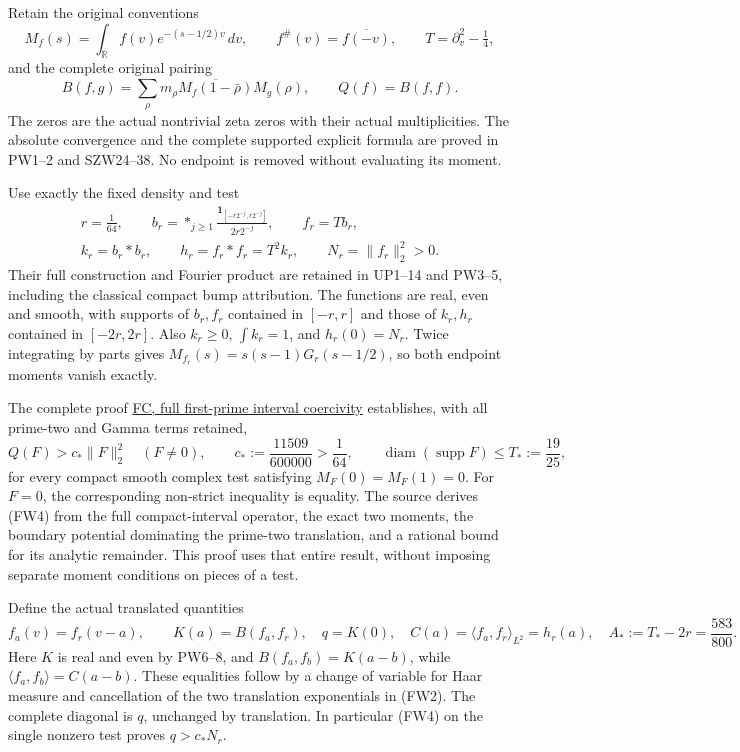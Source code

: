 \documentclass[
  10pt,
  a4paper,
]{article}
\begin{document}
Retain the original conventions \[
M_f(s)=\int_{\mathbb R}f(v)e^{-(s-1/2)v}\,dv,\qquad
f^\#(v)=\overline{f(-v)},\qquad
T=\partial_v^2-\tfrac14,
\tag{FW1}
\] and the complete original pairing \[
B(f,g)=\sum_\rho m_\rho\overline{M_f(1-\bar\rho)}M_g(\rho),
\qquad Q(f)=B(f,f).
\tag{FW2}
\] The zeros are the actual nontrivial zeta zeros with their actual
multiplicities. The absolute convergence and the complete supported
explicit formula are proved in PW1--2 and SZW24--38. No endpoint is
removed without evaluating its moment.

Use exactly the fixed density and test \[
\begin{gathered}
r=\tfrac1{64},\qquad
b_r=\mathop{*}_{j\ge1}\frac{\mathbf1_{[-r2^{-j},r2^{-j}]}}{2r2^{-j}},\qquad
f_r=Tb_r,\\
k_r=b_r*b_r,\qquad h_r=f_r*f_r=T^2k_r,\qquad
N_r=\|f_r\|_2^2>0.
\end{gathered}\tag{FW3}
\] Their full construction and Fourier product are retained in UP1--14
and PW3--5, including the classical compact bump attribution. The
functions are real, even and smooth, with supports of \(b_r,f_r\)
contained in \([-r,r]\) and those of \(k_r,h_r\) contained in
\([-2r,2r]\). Also \(k_r\ge0\), \(\int k_r=1\), and \(h_r(0)=N_r\).
Twice integrating by parts gives \(M_{f_r}(s)=s(s-1)G_r(s-1/2)\), so
both endpoint moments vanish exactly.

The complete proof \href{FIRST_PRIME_FULL_WEIL_COERCIVITY.md}{FC, full
first-prime interval coercivity} establishes, with all prime-two and
Gamma terms retained, \[
Q(F)>c_*\|F\|_2^2\quad(F\ne0),\qquad
c_*:=\frac{11509}{600000}>\frac1{64},\qquad
\operatorname{diam}(\operatorname{supp}F)\le T_*:=\frac{19}{25},
\tag{FW4}
\] for every compact smooth complex test satisfying \(M_F(0)=M_F(1)=0\).
For \(F=0\), the corresponding non-strict inequality is equality. The
source derives (FW4) from the full compact-interval operator, the exact
two moments, the boundary potential dominating the prime-two
translation, and a rational bound for its analytic remainder. This proof
uses that entire result, without imposing separate moment conditions on
pieces of a test.

Define the actual translated quantities \[
f_a(v)=f_r(v-a),\qquad
K(a)=B(f_a,f_r),\quad q=K(0),\quad
C(a)=\langle f_a,f_r\rangle_{L^2}=h_r(a),\quad
A_*:=T_*-2r=\frac{583}{800}.
\tag{FW5}
\] Here \(K\) is real and even by PW6--8, and \(B(f_a,f_b)=K(a-b)\),
while \(\langle f_a,f_b\rangle=C(a-b)\). These equalities follow by a
change of variable for Haar measure and cancellation of the two
translation exponentials in (FW2). The complete diagonal is \(q\),
unchanged by translation. In particular (FW4) on the single nonzero test
proves \(q>c_*N_r\).
\end{document}
